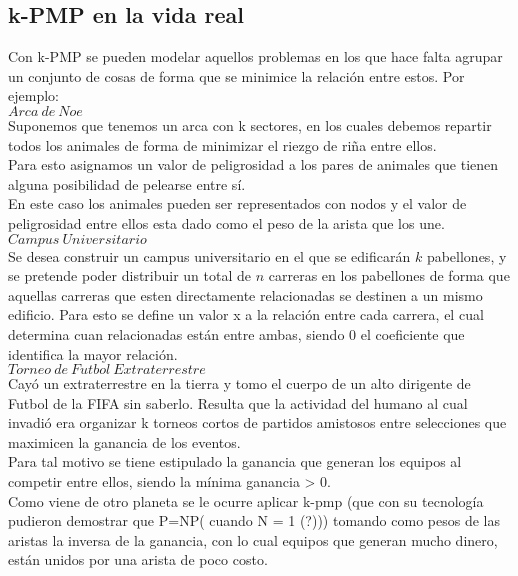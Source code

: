 \subsection{k-PMP en la vida real}

Con k-PMP se pueden modelar aquellos problemas en los que hace falta agrupar un conjunto de cosas de forma que se minimice la relación entre estos.
Por ejemplo:\\

$Arca\ de\ Noe$\\
Suponemos que tenemos un arca con k sectores, en los cuales debemos repartir todos los animales de forma de minimizar el riezgo de riña entre ellos.\\
Para esto asignamos un valor de peligrosidad a los pares de animales que tienen alguna posibilidad de pelearse entre s\'i.\\
En este caso los animales pueden ser representados con nodos y el valor de peligrosidad entre ellos esta dado como el peso de la arista que los une.\\


$Campus\ Universitario$\\
Se desea construir un campus universitario en el que se edificarán $k$ pabellones, y se pretende poder distribuir un total de $n$ carreras en los pabellones de forma que aquellas carreras que esten directamente relacionadas se destinen a un mismo edificio. Para esto se define un valor x a la relaci\'on entre cada carrera, el cual determina cuan relacionadas están entre ambas, siendo 0 el coeficiente que identifica la mayor relación.\\


$Torneo\ de\ Futbol\ Extraterrestre$\\
Cay\'o un extraterrestre en la tierra y tomo el cuerpo de un alto dirigente de Futbol de la FIFA sin saberlo. Resulta que la actividad del humano al cual invadi\'o era organizar k torneos cortos de partidos amistosos entre selecciones que maximicen la ganancia de los eventos.\\
Para tal motivo se tiene estipulado la ganancia que generan los equipos al competir entre ellos, siendo la m\'inima  ganancia > 0.\\
Como viene de otro planeta se le ocurre aplicar k-pmp (que con su tecnolog\'ia pudieron demostrar que P=NP( cuando N = 1 (?))) tomando como pesos de las aristas la inversa de la ganancia, con lo cual equipos que generan mucho dinero, est\'an unidos por una arista de poco costo.